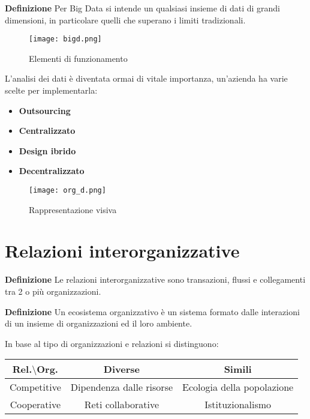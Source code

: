 \documentclass{article}
\newcommand{\df}{\noindent\textbf{Definizione }}
\begin{document}
\df Per Big Data si intende un qualsiasi insieme di dati di grandi dimensioni, in particolare quelli che superano i limiti tradizionali.\newline

\begin{figure}[ht]
    \centering
    \texttt{[image: bigd.png]}
    \caption{Elementi di funzionamento}
\end{figure}

\newpage

\noindent L'analisi dei dati è diventata ormai di vitale importanza, un'azienda ha varie scelte per implementarla:
\begin{itemize}
    \item \textbf{Outsourcing}
    \item \textbf{Centralizzato}
    \item \textbf{Design ibrido}
    \item \textbf{Decentralizzato}\newline
\end{itemize}

\begin{figure}[ht]
    \centering
    \texttt{[image: org\_d.png]}
    \caption{Rappresentazione visiva}
\end{figure}

\newpage

\section{Relazioni interorganizzative}

\df Le relazioni interorganizzative sono transazioni, flussi e collegamenti tra 2 o più organizzazioni.\newline

\df Un ecosistema organizzativo è un sistema formato dalle interazioni di un insieme di organizzazioni ed il loro ambiente.\newline

\noindent In base al tipo di organizzazioni e relazioni si distinguono:\newline

\begin{table}[ht]
    \centering
    \begin{tabular}{c|c|c}
        Rel.$\setminus$Org. & Diverse & Simili\\
        \hline
        Competitive & Dipendenza dalle risorse & Ecologia della popolazione\\
        \hline
        Cooperative & Reti collaborative & Istituzionalismo\\
    \end{tabular}
\end{table}
\end{document}

